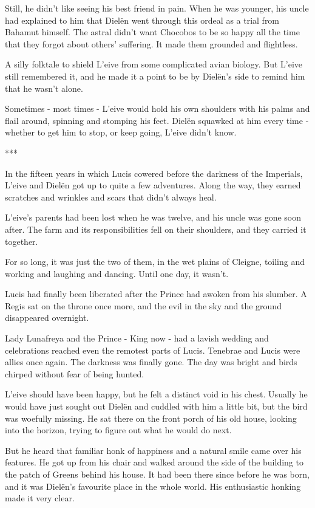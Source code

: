 Still, he didn’t like seeing his best friend in pain. When he was younger, his uncle had explained to him that Dielën went through this ordeal as a trial from Bahamut himself. The astral didn’t want Chocobos to be so happy all the time that they forgot about others’ suffering. It made them grounded and flightless.

A silly folktale to shield L'eive from some complicated avian biology. But L'eive still remembered it, and he made it a point to be by Dielën’s side to remind him that he wasn’t alone.

Sometimes - most times - L'eive would hold his own shoulders with his palms and flail around, spinning and stomping his feet. Dielën squawked at him every time - whether to get him to stop, or keep going, L'eive didn’t know.

\begin{center}
    ***
\end{center}

\noindent In the fifteen years in which Lucis cowered before the darkness of the Imperials, L'eive and Dielën got up to quite a few adventures. Along the way, they earned scratches and wrinkles and scars that didn’t always heal. 

L'eive’s parents had been lost when he was twelve, and his uncle was gone soon after. The farm and its responsibilities fell on their shoulders, and they carried it together.

For so long, it was just the two of them, in the wet plains of Cleigne, toiling and working and laughing and dancing. Until one day, it wasn’t.

Lucis had finally been liberated after the Prince had awoken from his slumber. A Regis sat on the throne once more, and the evil in the sky and the ground disappeared overnight.

Lady Lunafreya and the Prince - King now - had a lavish wedding and celebrations reached even the remotest parts of Lucis. Tenebrae and Lucis were allies once again. The darkness was finally gone.  The day was bright and birds chirped without fear of being hunted. 

L'eive should have been happy, but he felt a distinct void in his chest. Usually he would have just sought out Dielën and cuddled with him a little bit, but the bird was woefully missing. He sat there on the front porch of his old house, looking into the horizon, trying to figure out what he would do next. 

But he heard that familiar honk of happiness and a natural smile came over his features. He got up from his chair and walked around the side of the building to the patch of Greens behind his house. It had been there since before he was born, and it was Dielën’s favourite place in the whole world. His enthusiastic honking made it very clear.


